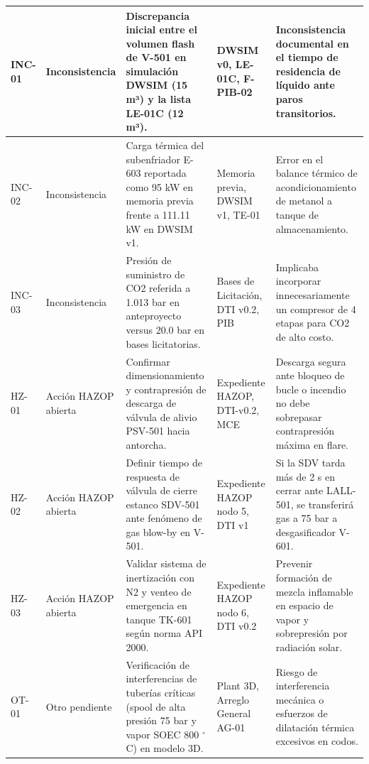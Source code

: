 \documentclass[10pt,letterpaper]{article}
\begin{document}
\begin{landscape}
\begin{xltabular}{\linewidth}{|l|p{2.8cm}|p{6.5cm}|p{3.2cm}|>{\raggedright\arraybackslash}X|}
INC-01 & Inconsistencia & Discrepancia inicial entre el volumen flash de V-501 en simulación DWSIM (15 m³) y la lista LE-01C (12 m³). & DWSIM v0, LE-01C, F-PIB-02 & Inconsistencia documental en el tiempo de residencia de líquido ante paros transitorios. \\ \hline
INC-02 & Inconsistencia & Carga térmica del subenfriador E-603 reportada como 95 kW en memoria previa frente a 111.11 kW en DWSIM v1. & Memoria previa, DWSIM v1, TE-01 & Error en el balance térmico de acondicionamiento de metanol a tanque de almacenamiento. \\ \hline
INC-03 & Inconsistencia & Presión de suministro de CO2 referida a 1.013 bar en anteproyecto versus 20.0 bar en bases licitatorias. & Bases de Licitación, DTI v0.2, PIB & Implicaba incorporar innecesariamente un compresor de 4 etapas para CO2 de alto costo. \\ \hline
HZ-01 & Acción HAZOP abierta & Confirmar dimensionamiento y contrapresión de descarga de válvula de alivio PSV-501 hacia antorcha. & Expediente HAZOP, DTI-v0.2, MCE & Descarga segura ante bloqueo de bucle o incendio no debe sobrepasar contrapresión máxima en flare. \\ \hline
HZ-02 & Acción HAZOP abierta & Definir tiempo de respuesta de válvula de cierre estanco SDV-501 ante fenómeno de gas blow-by en V-501. & Expediente HAZOP nodo 5, DTI v1 & Si la SDV tarda más de 2 s en cerrar ante LALL-501, se transferirá gas a 75 bar a desgasificador V-601. \\ \hline
HZ-03 & Acción HAZOP abierta & Validar sistema de inertización con N2 y venteo de emergencia en tanque TK-601 según norma API 2000. & Expediente HAZOP nodo 6, DTI v0.2 & Prevenir formación de mezcla inflamable en espacio de vapor y sobrepresión por radiación solar. \\ \hline
OT-01 & Otro pendiente & Verificación de interferencias de tuberías críticas (spool de alta presión 75 bar y vapor SOEC 800 $^\circ$C) en modelo 3D. & Plant 3D, Arreglo General AG-01 & Riesgo de interferencia mecánica o esfuerzos de dilatación térmica excesivos en codos. \\ \hline
\end{xltabular}
\end{landscape}
\end{document}
